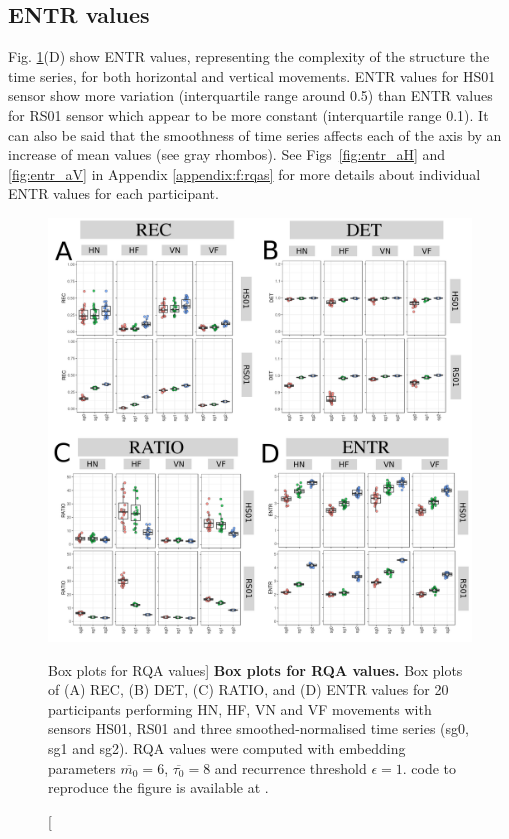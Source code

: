 \subsection*{ENTR values}
Fig. \ref{fig:RQABP}(D) show ENTR values, representing the complexity of 
the structure the time series, for both horizontal and vertical movements.
ENTR values for HS01 sensor show more variation 
(interquartile range around 0.5)
than ENTR values for RS01 sensor which appear 
to be more constant (interquartile range 0.1).
It can also be said that the smoothness of time series affects
each of the axis by an increase of mean values (see gray rhombos).
See Figs~\ref{fig:entr_aH} and \ref{fig:entr_aV} in Appendix
\ref{appendix:f:rqas}
for more details about individual ENTR values for each participant.

\begin{figure}
\centering
\includegraphics[width=1.0\textwidth]{fig_6_08}
    \caption
	[Box plots for RQA values]{
	{\bf Box plots for RQA values.}
	Box plots of (A) REC, (B) DET, (C) RATIO, and (D) ENTR values 
	for 20 participants performing HN, HF, VN and VF movements
	with sensors HS01, RS01 and three smoothed-normalised  
	time series (sg0, sg1 and sg2).
	RQA values were computed with 
	embedding parameters $\overline{m_0}=6$, $\overline{\tau_0}=8$ and
	recurrence threshold $\epsilon=1$.
	\R code to reproduce the figure is available at 
	.
        }
    \label{fig:RQABP}
\end{figure}

